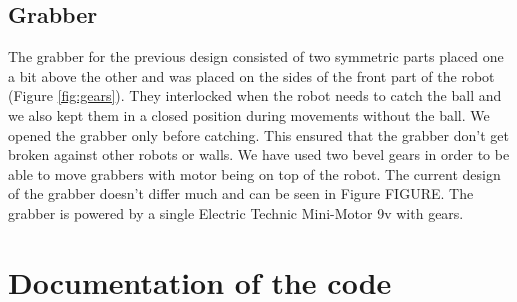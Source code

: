 \documentclass[a4paper,12pt]{article}
\begin{document}
\subsection{Grabber}
The grabber for the previous design consisted of two symmetric parts placed one a bit above the other and was placed on the sides of the front part of the robot (Figure \ref{fig:gears}). They interlocked when the robot needs to catch the ball and we also kept them in a closed position during movements without the ball. We opened the grabber only before catching. This ensured that the grabber don't get broken against other robots or walls. We have used two bevel gears in order to be able to move grabbers with motor being on top of the robot. The current design of the grabber doesn't differ much and can be seen in Figure FIGURE. The grabber is powered by a single Electric Technic Mini-Motor 9v with gears.

\section{Documentation of the code}
\end{document}
